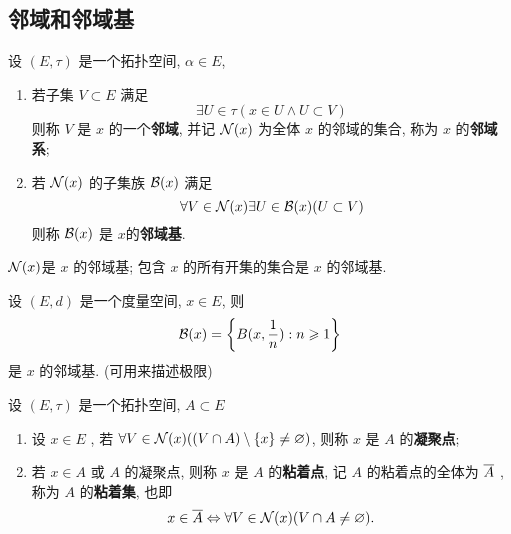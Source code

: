      \subsection{邻域和邻域基}

     \begin{Definition}[邻域基]\label{def:邻域基}
          设 $ (E, \tau) $ 是一个拓扑空间, $ \alpha\in E $, 
          \begin{enumerate}[(1)]
               \item 若子集 $ V\subset E $ 满足
               \[
                    \exists U\in \tau(x\in U\land U\subset V)
               \]
               则称 $ V $ 是 $ x $ 的一个\textbf{邻域}, 并记 $ \CN(x) $ 为全体 $ x $ 的邻域的集合, 称为 $ x $ 的\textbf{邻域系};
               \item 若 $ \CN(x) $ 的子集族 $ \CB(x) $ 满足
               \[
                    \forall V\in \CN(x)\exists U\in \CB(x)(U\subset V)
               \]  
               则称 $ \CB(x) $ 是 $ x $的\textbf{邻域基}. 
          \end{enumerate}
     \end{Definition}
     \begin{Remark}
          $ \CN(x) $是 $ x $  的邻域基; 包含 $ x $ 的所有开集的集合是 $ x $ 的邻域基. 
     \end{Remark}
     \begin{Example}
          设 $ (E, d) $ 是一个度量空间, $ x\in E $, 则 
          \[
               \CB(x)=\left\{ B(x,\frac{1}{n}): n\geqslant 1 \right\} 
          \]
          是 $ x $ 的邻域基. (可用来描述极限)
     \end{Example}
     \begin{Definition}[粘着集]
          设 $ (E, \tau) $ 是一个拓扑空间, $ A\subset E $ 
          \begin{enumerate}[(1)]
               \item 设 $ x\in E $ , 若 $ \forall V\in \CN(x)((V\cap A)\sm \{ x \}\neq\varnothing) $, 则称 $ x $ 是 $ A $ 的\textbf{凝聚点};
               \item 若 $ x\in A $ 或 $ A $  的凝聚点, 则称 $ x $ 是 $ A $ 的\textbf{粘着点}, 记 $ A $ 的粘着点的全体为 $ \baro{A} $ , 称为 $ A $ 的\textbf{粘着集}, 也即
               \[
                    x\in \baro{A}\Leftrightarrow \forall V\in \CN(x)(V\cap A\neq\varnothing).    
               \]
          \end{enumerate}
     \end{Definition}
